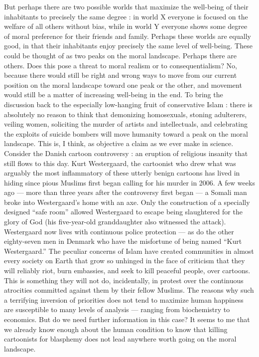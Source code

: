 \documentclass[a4paper,14pt]{extbook}
\begin{document}
But perhaps there are two possible worlds that maximize the well-being of their inhabitants to precisely the same degree :
in world X everyone is focused on the welfare of all others without bias, while in world Y everyone shows some degree of moral preference for their friends and family.
Perhaps these worlds are equally good, in that their inhabitants enjoy precisely the same level of well-being.
These could be thought of as two peaks on the moral landscape.
Perhaps there are others.
Does this pose a threat to moral realism or to consequentialism?
No, because there would still be right and wrong ways to move from our current position on the moral landscape toward one peak or the other, and movement would still be a matter of increasing well-being in the end.
To bring the discussion back to the especially low-hanging fruit of conservative Islam :
there is absolutely no reason to think that demonizing homosexuals, stoning adulterers, veiling women, soliciting the murder of artists and intellectuals, and celebrating the exploits of suicide bombers will move humanity toward a peak on the moral landscape.
This is, I think, as objective a claim as we ever make in science.
Consider the Danish cartoon controversy :
an eruption of religious insanity that still flows to this day.
Kurt Westergaard, the cartoonist who drew what was arguably the most inflammatory of these utterly benign cartoons has lived in hiding since pious Muslims first began calling for his murder in 2006.
A few weeks ago --- more than three years after the controversy first began --- a Somali man broke into Westergaard's home with an axe.
Only the construction of a specially designed ``safe room'' allowed Westergaard to escape being slaughtered for the glory of God (his five-year-old granddaughter also witnessed the attack).
Westergaard now lives with continuous police protection --- as do the other eighty-seven men in Denmark who have the misfortune of being named ``Kurt Westergaard.''
The peculiar concerns of Islam have created communities in almost every society on Earth that grow so unhinged in the face of criticism that they will reliably riot, burn embassies, and seek to kill peaceful people, over cartoons.
This is something they will not do, incidentally, in protest over the continuous atrocities committed against them by their fellow Muslims.
The reasons why such a terrifying inversion of priorities does not tend to maximize human happiness are susceptible to many levels of analysis --- ranging from biochemistry to economics.
But do we need further information in this case?
It seems to me that we already know enough about the human condition to know that killing cartoonists for blasphemy does not lead anywhere worth going on the moral landscape.
\end{document}
